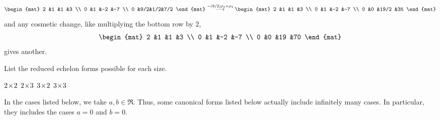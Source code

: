\begin{exercises}
\begin{answer}
\begin{equation*}
\begin{mat}
          2  &1  &1  &3  \\
          0  &1  &-2 &-7 \\
          0  &9/2&1/2&7/2
        \end{mat}
        \grstep{-(9/2)\rho_2+\rho_3}
        \begin{mat}
          2  &1  &1    &3  \\
          0  &1  &-2   &-7 \\
          0  &0  &19/2 &35
        \end{mat}
      \end{equation*}
      and any cosmetic change, like multiplying the bottom row by \( 2 \),
      \begin{equation*}
        \begin{mat}
          2  &1  &1    &3  \\
          0  &1  &-2   &-7 \\
          0  &0  &19   &70
        \end{mat}
      \end{equation*}
      gives another.  
    \end{answer}
  \recommended \item \label{exer:PossRedEchFrms} 
    List the reduced echelon forms possible for each size.
    \begin{exparts*}
      \partsitem \( 2 \! \times \! 2 \)
      \partsitem \( 2 \! \times \! 3 \)
      \partsitem \( 3 \! \times \! 2 \)
      \partsitem \( 3 \! \times \! 3 \)
    \end{exparts*}
    \begin{answer}
      In the cases listed below, we take $a,b\in\Re$.
      Thus, some canonical forms 
      listed below actually include infinitely many cases.
      In particular, they includes the cases $a=0$ and $b=0$.
\end{answer}
\end{exercises}
